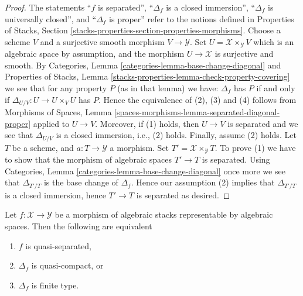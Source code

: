 \begin{proof}
The statements
``$f$ is separated'',
``$\Delta_f$ is a closed immersion'',
``$\Delta_f$ is universally closed'', and
``$\Delta_f$ is proper''
refer to the notions defined in
Properties of Stacks,
Section \ref{stacks-properties-section-properties-morphisms}.
Choose a scheme $V$ and a surjective smooth morphism $V \to \mathcal{Y}$.
Set $U = \mathcal{X} \times_{\mathcal{Y}} V$ which is an algebraic
space by assumption, and the morphism $U \to \mathcal{X}$ is surjective
and smooth. By
Categories, Lemma \ref{categories-lemma-base-change-diagonal}
and
Properties of Stacks,
Lemma \ref{stacks-properties-lemma-check-property-covering}
we see that for any property $P$ (as in that lemma) we have:
$\Delta_f$ has $P$ if and only if $\Delta_{U/V} : U \to  U \times_V U$ has $P$.
Hence the equivalence of (2), (3) and (4) follows from
Morphisms of Spaces,
Lemma \ref{spaces-morphisms-lemma-separated-diagonal-proper}
applied to $U \to V$.
Moreover, if (1) holds, then $U \to V$ is separated and we see that
$\Delta_{U/V}$ is a closed immersion, i.e., (2) holds.
Finally, assume (2) holds. Let $T$ be a scheme, and $a : T \to \mathcal{Y}$
a morphism. Set $T' = \mathcal{X} \times_{\mathcal{Y}} T$. To prove
(1) we have to show that the morphism of algebraic spaces $T' \to T$
is separated. Using
Categories, Lemma \ref{categories-lemma-base-change-diagonal}
once more we see that $\Delta_{T'/T}$ is the base change of
$\Delta_f$. Hence our assumption (2) implies that $\Delta_{T'/T}$
is a closed immersion, hence $T' \to T$ is separated as desired.
\end{proof}

\begin{lemma}
\label{lemma-representable-quasi-separated-diagonal-quasi-compact}
Let $f : \mathcal{X} \to \mathcal{Y}$ be a morphism of algebraic stacks
representable by algebraic spaces. Then the following are equivalent
\begin{enumerate}
\item $f$ is quasi-separated,
\item $\Delta_f$ is quasi-compact, or
\item $\Delta_f$ is finite type.
\end{enumerate}
\end{lemma}

